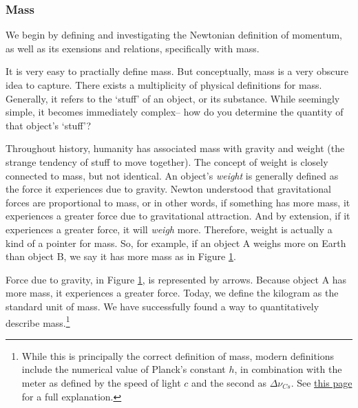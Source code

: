 \documentclass{article}
\begin{document}
            \subsubsection{Mass}
                We begin by defining and investigating the Newtonian definition of momentum, as well as its exensions and relations, specifically with mass. 
                \par
                It is very easy to practially define mass. But conceptually, mass is a very obscure idea to capture.
                There exists a multiplicity of physical definitions for mass. Generally, it refers to the `stuff' of an object, or its substance. While seemingly simple, it becomes immediately complex-- how do you determine the quantity of that object's `stuff'? 
                \par
                Throughout history, humanity has associated mass with gravity and weight (the strange tendency of stuff to move together). The concept of weight is closely connected to mass, but not identical. 
                An object's \textit{weight} is generally defined as the force it experiences due to gravity. Newton understood that gravitational forces are proportional to mass, or in other words, if something has more mass, it experiences a greater force due to gravitational attraction.
                And by extension, if it experiences a greater force, it will \textit{weigh} more. Therefore, weight is actually a kind of a pointer for mass. 
                So, for example, if an object A weighs more on Earth than object B, we say it has more mass as in Figure \ref{fig:weigh}.
                
                \begin{figure}[H]
                    \centering 
                    \caption{} \label{fig:weigh}
                \end{figure} 
            
                Force due to gravity, in Figure \ref{fig:weigh}, is represented by arrows. Because object A has more mass, it experiences a greater force. Today, we define the kilogram as the standard unit of mass. We have successfully found a way to quantitatively describe mass.\footnote{While this is principally the correct definition of mass, modern definitions include the numerical value of Planck's constant $h$, in combination with the meter as defined by the speed of light $c$ and the second as $\Delta \nu_{Cs}$. See \href{https://www.bipm.org/en/si-base-units/kilogram}{this page} for a full explanation.}
            
\end{document}

